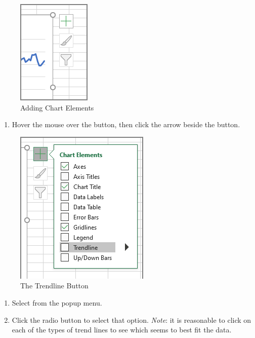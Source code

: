 \begin{figure}[H]
	\centering
	\includegraphics[width=\maxwidth{.95\linewidth}]{gfx/ch08_fig07}
	\caption{Adding Chart Elements}
	\label{08:fig07}
\end{figure}

\begin{enumerate}[resume]

	\item Hover the mouse over the  button, then click the arrow beside the button.

\end{enumerate}

\begin{figure}[H]
	\centering
	\includegraphics[width=\maxwidth{.95\linewidth}]{gfx/ch08_fig08}
	\caption{The Trendline Button}
	\label{08:fig08}
\end{figure}

\begin{enumerate}[resume]
	
	\item Select  from the  popup menu.
	\item Click the  radio button to select that option. \textit{Note}: it is reasonable to click on each of the types of trend lines to see which seems to best fit the data.
\end{enumerate}

